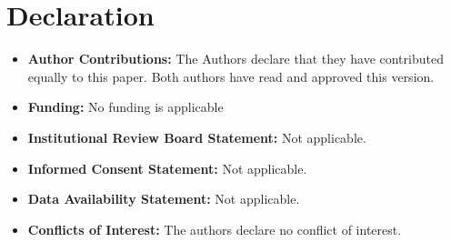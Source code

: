 \documentclass{article}
\begin{document}
\section*{Declaration }
\begin{itemize}
  \item {\bf Author Contributions:}   The Authors declare that they have contributed equally to this
paper. Both authors have read and approved this version.
  \item {\bf Funding:} No funding is applicable
  \item  {\bf Institutional Review Board Statement:} Not applicable.
  \item {\bf Informed Consent Statement:} Not applicable.
  \item {\bf Data Availability Statement:} Not applicable.
  \item {\bf Conflicts of Interest:} The authors declare no conflict of interest.
\end{itemize}








\end{document}
